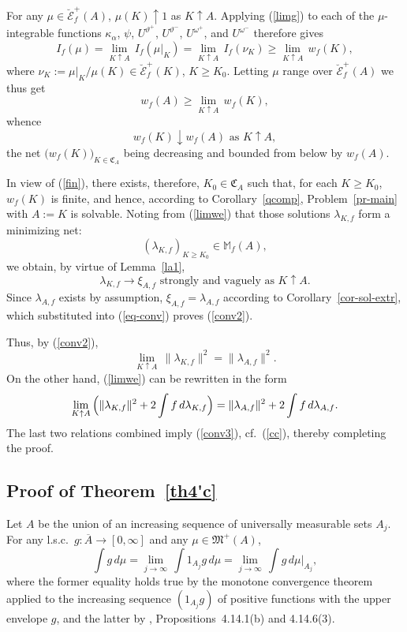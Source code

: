 \documentclass[12pt,a4paper,reqno]{amsart} %
\theoremstyle{lause}
\theoremstyle{maaritelma}
\theoremstyle{lause}
\theoremstyle{maaritelma}
\numberwithin{equation}{section}
\begin{document}
For any $\mu\in\breve{\mathcal E}_f^+(A)$, $\mu(K)\uparrow1$ as $K\uparrow A$. Applying (\ref{limg}) to each of the $\mu$-int\-egr\-able functions $\kappa_\alpha$, $\psi$, $U^{\vartheta^+}$, $U^{\vartheta^-}$, $U^{\omega^+}$, and $U^{\omega^-}$ therefore gives
\begin{equation*}
I_f(\mu)=\lim_{K\uparrow A}\,I_f(\mu|_K)=\lim_{K\uparrow A}\,I_f(\nu_K)\geqslant\lim_{K\uparrow A}\,w_f(K),
\end{equation*}
where $\nu_K:=\mu|_K/\mu(K)\in\breve{\mathcal E}_f^+(K)$, $K\geqslant K_0$. Letting $\mu$ range over $\breve{\mathcal E}_f^+(A)$ we thus get
\[w_f(A)\geqslant\lim_{K\uparrow A}\,w_f(K),\]
whence
\begin{equation}\label{limwe}
w_f(K)\downarrow w_f(A)\text{ \ as $K\uparrow A$},
\end{equation}
the net $\bigl(w_f(K)\bigr)_{K\in\mathfrak C_A}$ being decreasing and bounded from below by $w_f(A)$.

In view of (\ref{fin}), there exists, therefore, $K_0\in\mathfrak C_A$ such that, for each $K\geqslant K_0$, $w_f(K)$ is finite, and hence, according to Corollary~\ref{qcomp}, Problem~\ref{pr-main} with $A:=K$ is solvable. Noting from (\ref{limwe}) that those solutions $\lambda_{K,f}$ form a minimizing net:
\[(\lambda_{K,f})_{K\geqslant K_0}\in\mathbb M_f(A),\]
we obtain, by virtue of Lemma~\ref{la1},
\begin{equation}\label{eq-conv}
 \lambda_{K,f}\to\xi_{A,f}\text{ \ strongly and vaguely as $K\uparrow A$}.
\end{equation}
Since $\lambda_{A,f}$ exists by assumption, $\xi_{A,f}=\lambda_{A,f}$ according to Corollary~\ref{cor-sol-extr}, which substituted into (\ref{eq-conv}) proves (\ref{conv2}).

Thus, by (\ref{conv2}),
\[\lim_{K\uparrow A}\,\|\lambda_{K,f}\|^2=\|\lambda_{A,f}\|^2.\]
On the other hand, (\ref{limwe}) can be rewritten in the form
\[\lim_{K\uparrow A}\,\Bigl(\|\lambda_{K,f}\|^2+2\int f\,d\lambda_{K,f}\Bigr)=\|\lambda_{A,f}\|^2+2\int f\,d\lambda_{A,f}.\]
The last two relations combined imply (\ref{conv3}), cf.\ (\ref{cc}), thereby completing the proof.

\subsection{Proof of Theorem~\ref{th4'c}}\label{sec-pr2c}
Let $A$ be the union of an increasing sequence of universally measurable sets $A_j$.
For any l.s.c.\ $g:\overline{A}\to[0,\infty]$ and any $\mu\in\mathfrak M^+(A)$,
\begin{equation}\label{limg1}
 \int g\,d\mu=\lim_{j\to\infty}\,\int1_{A_j}g\,d\mu=\lim_{j\to\infty}\,\int g\,d\mu|_{A_j},
\end{equation}
where the former equality holds true by the monotone convergence theorem \cite[Section~IV.1, Theorem~3]{B2}
applied to the increasing sequence $(1_{A_j}g)$ of positive functions with the upper envelope $g$, and the latter by \cite{E2}, Propositions~4.14.1(b) and 4.14.6(3).
\end{document}
